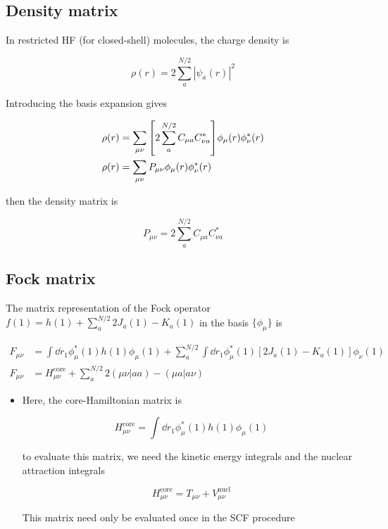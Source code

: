 \documentclass[11pt]{article}
\begin{document}
\subsection{Density matrix}
\label{sec:org4371283}

In restricted HF (for closed-shell) molecules, the charge density is

\[ \rho(r) = 2 \sum_a^{N/2} |\psi_a(r)|^2 \]

Introducing the basis expansion gives

\begin{align*}
    \rho(r) &= \sum_{\mu\nu}\qty[2\sum_a^{N/2}C_{\mu a}C_{\nu a}^{ * }]\phi_{\mu}(r)\phi_{\nu}^{ * }(r) \\
    \rho(r) &= \sum_{\mu\nu} P_{\mu\nu}\phi_{\mu}(r)\phi_{\nu}^{ * }(r)
\end{align*}

then the density matrix is

\begin{equation}
\label{eq:P-mat}
P_{\mu\nu}= 2 \sum_a^{N/2} C_{\mu a}C_{\nu a}^{ * }
\end{equation}
\subsection{Fock matrix}
\label{sec:org8223d82}

The matrix representation of the Fock operator \(f(1) = h(1) + \displaystyle\sum_a^{N/2} 2J_a(1) - K_a(1)\) in the basis \(\{\phi_{\mu}\}\) is

\begin{align*}
    F_{\mu\nu} &= \int\dd{r_1} \phi_{\mu}^{ * }(1)h(1)\phi_{\mu}(1) + \sum_a^{N/2}\int\dd{r_1}\phi_{\mu}^{ * }(1)[2J_a(1)-K_a(1)]\phi_{\nu}(1) \\
    F_{\mu\nu} &= H_{\mu\nu}^{\text{core}} + \sum_a^{N/2} 2 (\mu\nu|aa) - (\mu a|a \nu)
\end{align*}

\begin{itemize}
\item Here, the core-Hamiltonian matrix is

\[ H_{\mu\nu}^{\text{core}} = \int \dd{r_1} \phi_{\mu}^{ * }(1)h(1)\phi_{\mu}(1) \]

to evaluate this matrix, we need the kinetic energy integrals and the nuclear attraction integrals

\[ H_{\mu\nu}^{\text{core}} = T_{\mu\nu}+ V_{\mu\nu}^{\text{nucl}} \]

This matrix need only be evaluated once in the SCF procedure
\end{itemize}
\end{document}
